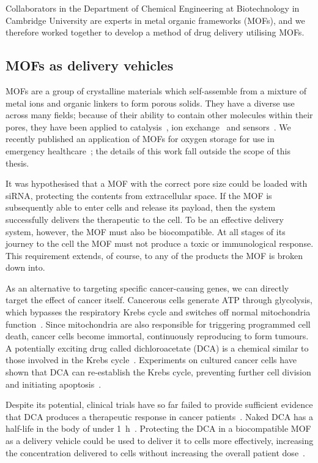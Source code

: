 Collaborators in the Department of Chemical Engineering at Biotechnology in Cambridge University are experts in metal organic frameworks (MOFs), and we therefore worked together to develop a method of drug delivery utilising MOFs.


\subsection{MOFs as delivery vehicles}
MOFs are a group of crystalline materials which self-assemble from a mixture of metal ions and organic linkers to form porous solids. 
They have a diverse use across many fields; because of their ability to contain other molecules within their pores, they have been applied to catalysis~\cite{ma2009enantioselective, farrusseng2011metal}, ion exchange~\cite{custelcean2007anion, fei2010reversible} and sensors~\cite{kreno2011metal, miller2016metal}. 
We recently published an application of MOFs for oxygen storage for use in emergency healthcare~\cite{moghadam2018computer}; the details of this work fall outside the scope of this thesis. 

It was hypothesised that a MOF with the correct pore size could be loaded with siRNA, protecting the contents from extracellular space. 
If the MOF is subsequently able to enter cells and release its payload, then the system successfully delivers the therapeutic to the cell. 
To be an effective delivery system, however, the MOF must also be biocompatible.
At all stages of its journey to the cell the MOF must not produce a toxic or immunological response. 
This requirement extends, of course, to any of the products the MOF is broken down into. 

As an alternative to targeting specific cancer-causing genes, we can directly target the effect of cancer itself. 
Cancerous cells generate ATP through glycolysis, which bypasses the respiratory Krebs cycle and switches off normal mitochondria function~\cite{murray1993cell, warburg1930uber}. 
Since mitochondria are also responsible for triggering programmed cell death, cancer cells become immortal, continuously reproducing to form tumours. 
A potentially exciting drug called dichloroacetate (DCA) is a chemical similar to those involved in the Krebs cycle~\cite{michelakis2008dichloroacetate, matsuhashi2015activation}. 
Experiments on cultured cancer cells have shown that DCA can re-establish the Krebs cycle, preventing further cell division and initiating apoptosis~\cite{bonnet2007mitochondria}. 

Despite its potential, clinical trials have so far failed to provide sufficient evidence that DCA produces a therapeutic response in cancer patients~\cite{michelakis2010metabolic}. 
Naked DCA has a half-life in the body of under \SI{1}{\hour}~\cite{michelakis2008dichloroacetate}. 
Protecting the DCA in a biocompatible MOF as a delivery vehicle could be used to deliver it to cells more effectively, increasing the concentration delivered to cells without increasing the overall patient dose~\cite{abanades2018mechanistic}. 

